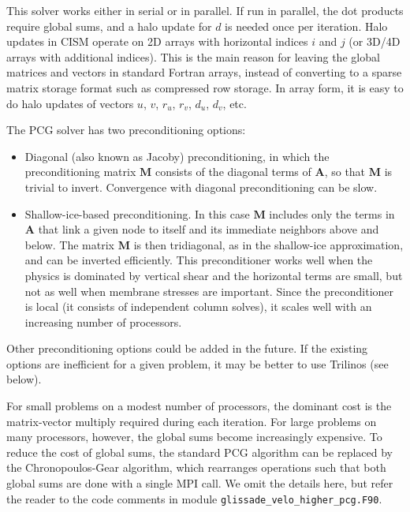 {This solver works either in serial or in parallel.  If run in parallel, the dot products
require global sums, and a halo update for $d$ is needed once per iteration.
Halo updates in CISM operate on 2D arrays with horizontal indices $i$ and $j$ (or 3D/4D 
arrays with additional indices).  This is the main reason for
leaving the global matrices and vectors in standard Fortran arrays, instead of
converting to a sparse matrix storage format such as compressed row storage.
In array form, it is easy to do halo updates of vectors $u$, $v$, $r_u$, $r_v$, $d_u$, $d_v$, etc.

The PCG solver has two preconditioning options:

\begin{itemize}
\item Diagonal (also known as Jacoby) preconditioning, in which the preconditioning matrix $\mathbf{M}$ consists
of the diagonal terms of $\mathbf{A}$, so that $\mathbf{M}$ is trivial to invert.  Convergence with diagonal preconditioning 
can be slow.
\item Shallow-ice-based preconditioning.  In this case $\mathbf{M}$ includes only the terms in $\mathbf{A}$
that link a given node to itself and its immediate neighbors above and below. The matrix $\mathbf{M}$ is then
tridiagonal, as in the shallow-ice approximation, and can be inverted efficiently. This preconditioner
works well when the physics is dominated by vertical shear and the horizontal terms are small, but not
as well when membrane stresses are important. Since the preconditioner is local (it consists of
independent column solves), it scales well with an increasing number of processors.
\end{itemize}

\noindent
Other preconditioning options could be added in the future. 
If the existing options are inefficient for a given problem, it may be better to use Trilinos (see below).

For small problems on a modest number of processors, the dominant cost is the matrix-vector
multiply required during each iteration.  For large problems on many processors, however, the global sums become
increasingly expensive.  To reduce the cost of global sums, the standard PCG algorithm can be
replaced by the Chronopoulos-Gear algorithm, which rearranges operations such that both global sums
are done with a single MPI call.  We omit the details here, but refer the reader
to the code comments in module \texttt{glissade\_velo\_higher\_pcg.F90}. 

}
